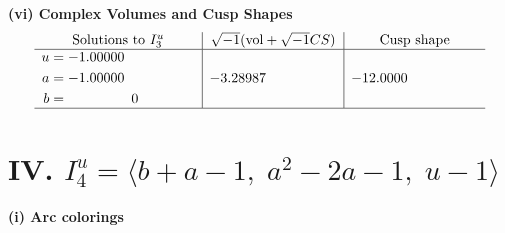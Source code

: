 \documentclass[1p]{elsarticle_modified}
\theoremstyle{definition}
\newcommand{\I}{\sqrt{-1}}
\begin{document}
\newpage\flushleft \textbf{(vi) Complex Volumes and Cusp Shapes}
$$\begin{array}{c|c|c}  
\text{Solutions to }I^u_{3}& \I (\text{vol} + \sqrt{-1}CS) & \text{Cusp shape}\\
 \hline 
\begin{aligned}
u &= -1.00000\phantom{ +0.000000I} \\
a &= -1.00000\phantom{ +0.000000I} \\
b &= \phantom{-0.000000 } 0\end{aligned}
 & -3.28987\phantom{ +0.000000I} & -12.0000\phantom{ +0.000000I}\\
 \hline 
 \end{array}$$\newpage\newpage\renewcommand{\arraystretch}{1}
\centering \section*{IV. $I^u_{4}= \langle b+a-1,\;a^2-2 a-1,\;u-1 \rangle$}
\flushleft \textbf{(i) Arc colorings}\\
\end{document}
